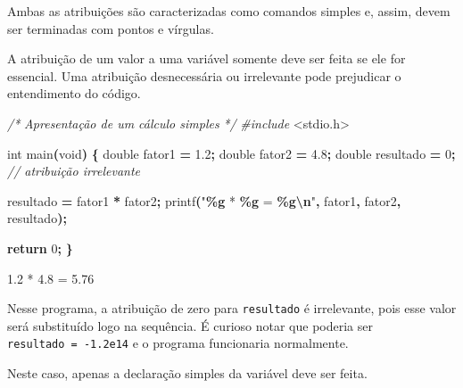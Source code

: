 \documentclass[
  11pt,
  a4paper,
]{scrbook}
\newenvironment{Shaded}{\begin{snugshade}}{\end{snugshade}}
\newcommand{\CommentTok}[1]{\textcolor[rgb]{0.56,0.35,0.01}{\textit{#1}}}
\newcommand{\ControlFlowTok}[1]{\textcolor[rgb]{0.13,0.29,0.53}{\textbf{#1}}}
\newcommand{\DataTypeTok}[1]{\textcolor[rgb]{0.13,0.29,0.53}{#1}}
\newcommand{\DecValTok}[1]{\textcolor[rgb]{0.00,0.00,0.81}{#1}}
\newcommand{\FloatTok}[1]{\textcolor[rgb]{0.00,0.00,0.81}{#1}}
\newcommand{\ImportTok}[1]{#1}
\newcommand{\NormalTok}[1]{#1}
\newcommand{\OperatorTok}[1]{\textcolor[rgb]{0.81,0.36,0.00}{\textbf{#1}}}
\newcommand{\PreprocessorTok}[1]{\textcolor[rgb]{0.56,0.35,0.01}{\textit{#1}}}
\newcommand{\SpecialCharTok}[1]{\textcolor[rgb]{0.81,0.36,0.00}{\textbf{#1}}}
\newcommand{\StringTok}[1]{\textcolor[rgb]{0.31,0.60,0.02}{#1}}
\begin{document}
Ambas as atribuições são caracterizadas como comandos simples e, assim,
devem ser terminadas com pontos e vírgulas.

\begin{tcolorbox}[enhanced jigsaw, arc=.35mm, bottomtitle=1mm, colbacktitle=quarto-callout-tip-color!10!white, title=\textcolor{quarto-callout-tip-color}{\faLightbulb}\hspace{0.5em}{Dica}, toprule=.15mm, left=2mm, opacityback=0, colback=white, colframe=quarto-callout-tip-color-frame, opacitybacktitle=0.6, bottomrule=.15mm, leftrule=.75mm, toptitle=1mm, coltitle=black, titlerule=0mm, rightrule=.15mm, breakable]

A atribuição de um valor a uma variável somente deve ser feita se ele
for essencial. Uma atribuição desnecessária ou irrelevante pode
prejudicar o entendimento do código.

\begin{Shaded}
\begin{Highlighting}[]
\CommentTok{/* }
\CommentTok{Apresentação de um cálculo simples}
\CommentTok{*/}
\PreprocessorTok{\#include }\ImportTok{\textless{}stdio.h\textgreater{}}

\DataTypeTok{int}\NormalTok{ main}\OperatorTok{(}\DataTypeTok{void}\OperatorTok{)} \OperatorTok{\{}
    \DataTypeTok{double}\NormalTok{ fator1 }\OperatorTok{=} \FloatTok{1.2}\OperatorTok{;}
    \DataTypeTok{double}\NormalTok{ fator2 }\OperatorTok{=} \FloatTok{4.8}\OperatorTok{;}
    \DataTypeTok{double}\NormalTok{ resultado }\OperatorTok{=} \DecValTok{0}\OperatorTok{;}  \CommentTok{// atribuição irrelevante}

\NormalTok{    resultado }\OperatorTok{=}\NormalTok{ fator1 }\OperatorTok{*}\NormalTok{ fator2}\OperatorTok{;}
\NormalTok{    printf}\OperatorTok{(}\StringTok{"}\SpecialCharTok{\%g}\StringTok{ * }\SpecialCharTok{\%g}\StringTok{ = }\SpecialCharTok{\%g\textbackslash{}n}\StringTok{"}\OperatorTok{,}\NormalTok{ fator1}\OperatorTok{,}\NormalTok{ fator2}\OperatorTok{,}\NormalTok{ resultado}\OperatorTok{);}

    \ControlFlowTok{return} \DecValTok{0}\OperatorTok{;}
\OperatorTok{\}}
\end{Highlighting}
\end{Shaded}

\begin{Shaded}
\begin{Highlighting}[]
\NormalTok{1.2 * 4.8 = 5.76}
\end{Highlighting}
\end{Shaded}

Nesse programa, a atribuição de zero para \texttt{resultado} é
irrelevante, pois esse valor será substituído logo na sequência. É
curioso notar que poderia ser \texttt{resultado\ =\ -1.2e14} e o
programa funcionaria normalmente.

Neste caso, apenas a declaração simples da variável deve ser feita.

\end{tcolorbox}
\end{document}
